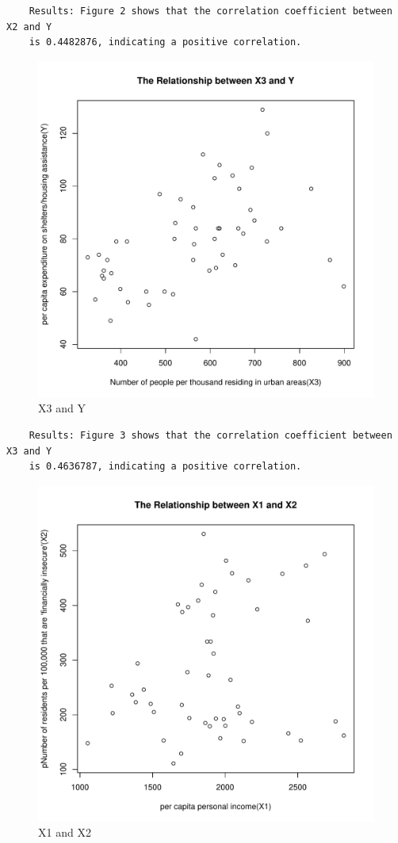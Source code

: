 \documentclass[12pt,letterpaper]{article}
\begin{document}
\begin{itemize}
\begin{verbatim} 
	Results: Figure 2 shows that the correlation coefficient between X2 and Y 
	is 0.4482876, indicating a positive correlation.
\end{verbatim}

\newpage
\begin{figure}[h!]\centering
	\caption{\footnotesize X3 and Y}
	\label{fig:plot_3}
	\includegraphics[width=.75\textwidth]{scatter_plot3_X3&Y.pdf}
\end{figure}

\begin{verbatim} 
	Results: Figure 3 shows that the correlation coefficient between X3 and Y 
	is 0.4636787, indicating a positive correlation.
\end{verbatim}

\newpage
\begin{figure}[h!]\centering
	\caption{\footnotesize X1 and X2}
	\label{fig:plot_4}
	\includegraphics[width=.75\textwidth]{scatter_plot4_X1&X2.pdf}
\end{figure}


\end{itemize}
\end{document}
